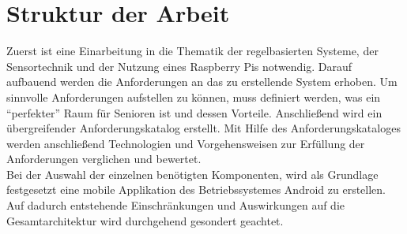 \section{Struktur der Arbeit}
Zuerst ist eine Einarbeitung in die Thematik der regelbasierten Systeme, der Sensortechnik und der Nutzung eines Raspberry Pis notwendig. Darauf aufbauend werden die Anforderungen an das zu erstellende System erhoben. Um sinnvolle Anforderungen aufstellen zu können, muss definiert werden, was ein ``perfekter'' Raum für Senioren ist und dessen Vorteile. Anschließend wird ein übergreifender Anforderungskatalog erstellt. Mit Hilfe des Anforderungskataloges werden anschließend Technologien und Vorgehensweisen zur Erfüllung der Anforderungen verglichen und bewertet.\\
Bei der Auswahl der einzelnen benötigten Komponenten, wird als Grundlage festgesetzt eine mobile Applikation des Betriebssystemes Android zu erstellen. Auf dadurch entstehende Einschränkungen und Auswirkungen auf die Gesamtarchitektur wird durchgehend gesondert geachtet. 	